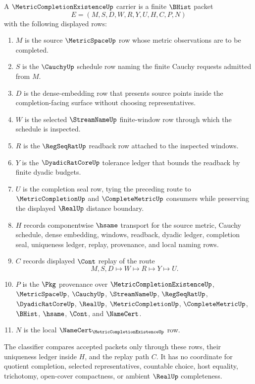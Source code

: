 \begin{definition}
\label{def:metric-completion-existence-carrier}
A $\MetricCompletionExistenceUp$ carrier is a finite $\BHist$ packet
$$
E=(M,S,D,W,R,Y,U,H,C,P,N)
$$
with the following displayed rows:
\begin{enumerate}
\item $M$ is the source $\MetricSpaceUp$ row whose metric observations are to be completed.
\item $S$ is the $\CauchyUp$ schedule row naming the finite Cauchy requests admitted from $M$.
\item $D$ is the dense-embedding row that presents source points inside the completion-facing surface without choosing representatives.
\item $W$ is the selected $\StreamNameUp$ finite-window row through which the schedule is inspected.
\item $R$ is the $\RegSeqRatUp$ readback row attached to the inspected windows.
\item $Y$ is the $\DyadicRatCoreUp$ tolerance ledger that bounds the readback by finite dyadic budgets.
\item $U$ is the completion seal row, tying the preceding route to $\MetricCompletionUp$ and $\CompleteMetricUp$ consumers while preserving the displayed $\RealUp$ distance boundary.
\item $H$ records componentwise $\hsame$ transport for the source metric, Cauchy schedule, dense embedding, windows, readback, dyadic ledger, completion seal, uniqueness ledger, replay, provenance, and local naming rows.
\item $C$ records displayed $\Cont$ replay of the route
$$
M,S,D \longmapsto W \longmapsto R \longmapsto Y \longmapsto U .
$$
\item $P$ is the $\Pkg$ provenance over $\MetricCompletionExistenceUp$, $\MetricSpaceUp$, $\CauchyUp$, $\StreamNameUp$, $\RegSeqRatUp$, $\DyadicRatCoreUp$, $\RealUp$, $\MetricCompletionUp$, $\CompleteMetricUp$, $\BHist$, $\hsame$, $\Cont$, and $\NameCert$.
\item $N$ is the local $\NameCert_{\MetricCompletionExistenceUp}$ row.
\end{enumerate}
The classifier compares accepted packets only through these rows, their uniqueness ledger inside $H$, and the replay path $C$. It has no coordinate for quotient completion, selected representatives, countable choice, host equality, trichotomy, open-cover compactness, or ambient $\RealUp$ completeness.
\end{definition}

